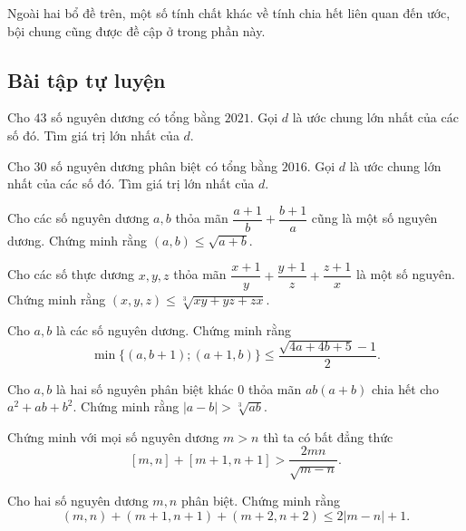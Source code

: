 Ngoài hai bổ đề trên, một số tính chất khác về tính chia hết liên quan đến ước, bội chung cũng được đề cập ở trong phần này.

\subsection*{Bài tập tự luyện}

\begin{btt}
Cho $43$ số nguyên dương có tổng bằng $2021$. Gọi $ d $ là ước chung lớn nhất của các số đó. Tìm giá trị lớn nhất của $d.$
\end{btt}

\begin{btt}
Cho $30$ số nguyên dương phân biệt có tổng bằng $2016$. Gọi $ d $ là ước chung lớn nhất của các số đó. Tìm giá trị lớn nhất của $ d$.
\end{btt}

\begin{btt}
Cho các số nguyên dương $a,b$ thỏa mãn $\dfrac{a+1}{b}+\dfrac{b+1}{a}$ cũng là một số nguyên dương. Chứng minh rằng 
$(a,b)\le \sqrt{a+b}.$
\end{btt}

\begin{btt}
Cho các số thực dương $x,y,z$ thỏa mãn $\dfrac{x+1}{y}+\dfrac{y+1}{z}+\dfrac{z+1}{x}$ là một số nguyên. Chứng minh rằng $(x,y,z)\leq \sqrt[3]{x y+y z+z x}.$
\end{btt}

\begin{btt}
Cho $a,b$ là các số nguyên dương. Chứng minh rằng
$$\min \{(a, b+1);(a+1, b)\} \leq \dfrac{\sqrt{4 a+4 b+5}-1}{2}.$$
\end{btt}

\begin{btt}
Cho $a,b$ là hai số nguyên phân biệt khác $0$ thỏa mãn $ab(a+b)$ chia hết cho $a^{2}+a b+b^{2}$. Chứng minh rằng $|a-b|>\sqrt[3]{a b}$.
\end{btt}

\begin{btt}
Chứng minh với mọi số nguyên dương $m > n$ thì ta có bất đẳng thức
\[\left[ {m,n} \right] + \left[ {m + 1,n + 1} \right] > \dfrac{{2mn}}{{\sqrt {m - n} }}.\]
\end{btt}

\begin{btt}
Cho hai số nguyên dương $m,n$ phân biệt. Chứng minh rằng
$$(m, n)+(m+1, n+1)+(m+2, n+2) \leq 2|m-n|+1.$$
\end{btt}

